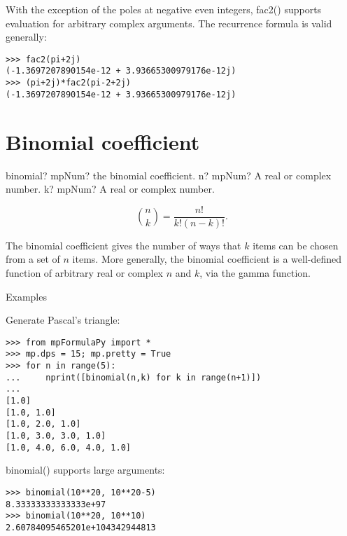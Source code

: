 With the exception of the poles at negative even integers, fac2() supports evaluation for arbitrary complex arguments. The recurrence formula is valid generally:

\begin{lstlisting}
>>> fac2(pi+2j)
(-1.3697207890154e-12 + 3.93665300979176e-12j)
>>> (pi+2j)*fac2(pi-2+2j)
(-1.3697207890154e-12 + 3.93665300979176e-12j)
\end{lstlisting}




\newpage
\section{Binomial coefficient}


\begin{mpFunctionsExtract}
	\mpFunctionTwo
	{binomial? mpNum? the binomial coefficient.}
	{n? mpNum? A real or complex number.}
	{k? mpNum? A real or complex number.}	
\end{mpFunctionsExtract}




\begin{equation}
\binom{n}{k}=\frac{n!}{k!(n-k)!}.
\end{equation}

The binomial coefficient gives the number of ways that $k$ items can be chosen from a set of $n$ items. More generally, the binomial coefficient is a well-defined function of arbitrary real or complex $n$ and $k$, via the gamma function.

Examples

Generate Pascal's triangle:

\begin{lstlisting}
>>> from mpFormulaPy import *
>>> mp.dps = 15; mp.pretty = True
>>> for n in range(5):
...     nprint([binomial(n,k) for k in range(n+1)])
...
[1.0]
[1.0, 1.0]
[1.0, 2.0, 1.0]
[1.0, 3.0, 3.0, 1.0]
[1.0, 4.0, 6.0, 4.0, 1.0]
\end{lstlisting}

binomial() supports large arguments:

\begin{lstlisting}
>>> binomial(10**20, 10**20-5)
8.33333333333333e+97
>>> binomial(10**20, 10**10)
2.60784095465201e+104342944813
\end{lstlisting}




